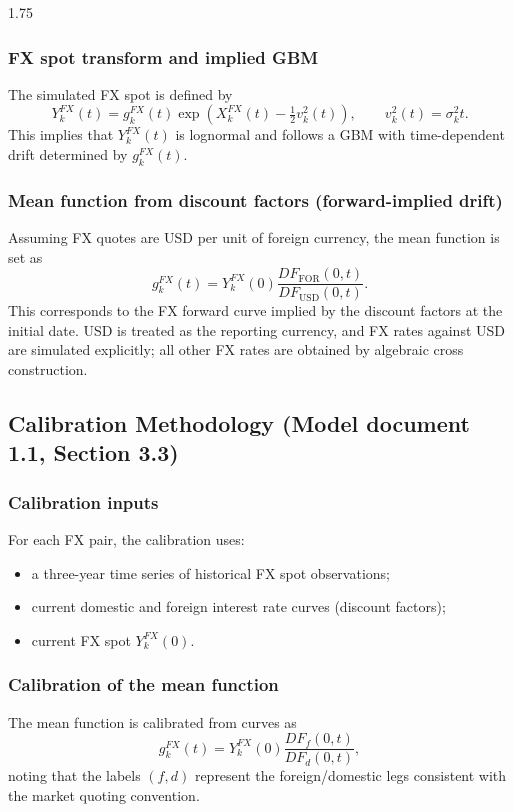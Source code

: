 \begin{spacing}{1.75}
{		\subsubsection{FX spot transform and implied GBM}
		The simulated FX spot is defined by
		\[
		Y_k^{FX}(t)=g_k^{FX}(t)\exp\!\left(X_k^{FX}(t)-\tfrac{1}{2}v_k^2(t)\right),
		\qquad v_k^2(t)=\sigma_k^2 t.
		\]
		This implies that $Y_k^{FX}(t)$ is lognormal and follows a GBM with time-dependent drift determined by $g_k^{FX}(t)$.
		
		\subsubsection{Mean function from discount factors (forward-implied drift)}
		Assuming FX quotes are USD per unit of foreign currency, the mean function is set as
		\[
		g_k^{FX}(t)=Y_k^{FX}(0)\frac{DF_{\text{FOR}}(0,t)}{DF_{\text{USD}}(0,t)}.
		\]
		This corresponds to the FX forward curve implied by the discount factors at the initial date. USD is treated as the reporting currency,
		and FX rates against USD are simulated explicitly; all other FX rates are obtained by algebraic cross construction.
		
		\subsection{Calibration Methodology (Model document 1.1, Section 3.3)}
		\subsubsection{Calibration inputs}
		For each FX pair, the calibration uses:
		\begin{itemize}
			\item a three-year time series of historical FX spot observations;
			\item current domestic and foreign interest rate curves (discount factors);
			\item current FX spot $Y_k^{FX}(0)$.
		\end{itemize}
		
		\subsubsection{Calibration of the mean function}
		The mean function is calibrated from curves as
		\[
		g_k^{FX}(t)=Y_k^{FX}(0)\frac{DF_f(0,t)}{DF_d(0,t)},
		\]
		noting that the labels $(f,d)$ represent the foreign/domestic legs consistent with the market quoting convention.
		
}
\end{spacing}
